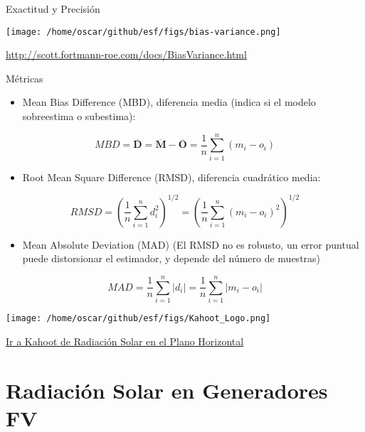 \documentclass[xcolor={usenames,svgnames,dvipsnames}]{beamer}
\begin{document}
\begin{frame}[label={sec:org0eb4aa6}]{Exactitud y Precisión}
\begin{center}
\texttt{[image: /home/oscar/github/esf/figs/bias-variance.png]}
\end{center}

\url{http://scott.fortmann-roe.com/docs/BiasVariance.html}
\end{frame}

\begin{frame}[label={sec:org1b07f58}]{Métricas}
\begin{itemize}
\item \alert{Mean Bias Difference (MBD)}, diferencia media (indica si el modelo sobreestima o subestima):
\end{itemize}
\[
MBD = \overline{\mathbf{D}} = \overline{\mathbf{M}} - \overline{\mathbf{O}} = \frac{1}{n} \sum_{i=1}^n (m_i - o_i)
\]

\begin{itemize}
\item \alert{Root Mean Square Difference (RMSD)}, diferencia cuadrático media:
\end{itemize}
\[
RMSD = \left(\frac{1}{n} \sum_{i=1}^n d_i^2 \right)^{1/2} =  \left( \frac{1}{n} \sum_{i=1}^n (m_i - o_i)^2  \right)^{1/2}
\]

\begin{itemize}
\item \alert{Mean Absolute Deviation (MAD)} (El RMSD no es robusto, un error puntual puede distorsionar el estimador, y depende del número de muestras)
\end{itemize}

\[
MAD = \frac{1}{n} \sum_{i=1}^n \left|d_i\right| =  \frac{1}{n} \sum_{i=1}^n \left|m_i - o_i\right|
\]
\end{frame}
\begin{frame}[label={sec:orgbf374d7}]{}
\begin{center}
\texttt{[image: /home/oscar/github/esf/figs/Kahoot\_Logo.png]}
\end{center}

\href{https://play.kahoot.it/v2/?quizId=62ee25e6-4056-4321-b95c-7af71b3fb069}{Ir a Kahoot de Radiación Solar en el Plano Horizontal}
\end{frame}

\section{Radiación Solar en Generadores FV}
\label{sec:orga90cd8b}
\end{document}

